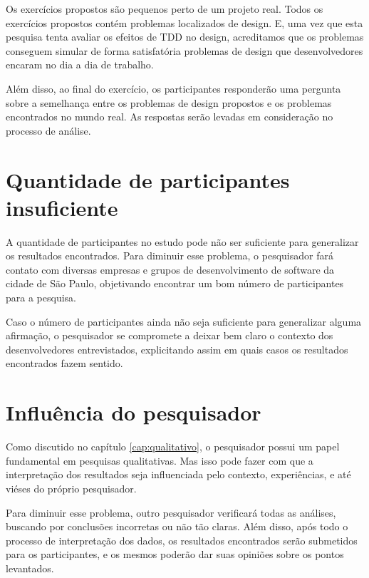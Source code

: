 Os exercícios propostos são pequenos perto de um projeto real. Todos os exercícios propostos contém
problemas localizados de design. E, uma vez que esta pesquisa tenta avaliar os efeitos de TDD no design, 
acreditamos que os problemas conseguem simular de forma satisfatória
problemas de design que desenvolvedores encaram no dia a dia de trabalho.

Além disso, ao final do exercício, os participantes responderão uma pergunta sobre a semelhança
entre os problemas de design propostos e os problemas encontrados no mundo real.
As respostas serão levadas em consideração no processo de análise.

\section{Quantidade de participantes insuficiente}

A quantidade de participantes no estudo pode não ser suficiente para generalizar
os resultados encontrados. Para diminuir esse problema, o pesquisador fará contato
com diversas empresas e grupos de desenvolvimento de software da cidade de São Paulo,
objetivando encontrar um bom número de participantes para a pesquisa.

Caso o número de participantes ainda não seja suficiente para generalizar alguma afirmação, 
o pesquisador se compromete a deixar bem claro o contexto dos desenvolvedores entrevistados,
explicitando assim em quais casos os resultados encontrados fazem sentido.

\section{Influência do pesquisador}

Como discutido no capítulo \ref{cap:qualitativo}, o pesquisador possui
um papel fundamental em pesquisas qualitativas. Mas isso pode fazer com que
a interpretação dos resultados seja influenciada pelo contexto, experiências,
e até viéses do próprio pesquisador.

Para diminuir esse problema, outro pesquisador verificará todas as análises,
buscando por conclusões incorretas ou não tão claras. Além disso, após todo o
processo de interpretação dos dados, os resultados encontrados serão submetidos
para os participantes, e os mesmos poderão dar suas opiniões sobre os pontos
levantados.